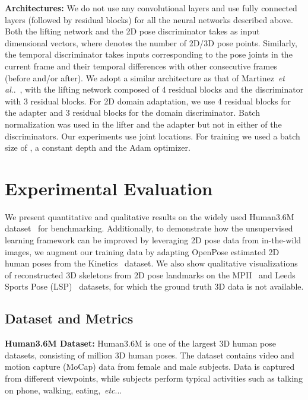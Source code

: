 \documentclass[10pt,twocolumn,letterpaper]{article}
\makeatletter
\DeclareRobustCommand\onedot{\futurelet\@let@token\@onedot}
\def\@onedot{\ifx\@let@token.\else.\null\fi\xspace}
\def\etc{\emph{etc}\onedot} \def\vs{\emph{vs}\onedot}
\def\etal{\emph{et al}\onedot}
\makeatother
\begin{document}
\textbf{Architectures:} We do not use any convolutional layers and use fully connected layers (followed by residual blocks) for all the neural networks described above. Both the lifting network and the 2D pose discriminator takes as input  dimensional vectors, where  denotes the number of 2D/3D pose points. Similarly, the temporal discriminator takes  inputs corresponding to the pose joints in the current frame and their temporal differences with  other consecutive frames (before and/or after). We adopt a similar architecture as that of Martinez~\etal~\cite{MartinezICCV2017}, with the lifting network composed of 4 residual blocks and the discriminator with 3 residual blocks. For 2D domain adaptation, we use 4 residual blocks for the adapter and 3 residual blocks for the domain discriminator. Batch normalization was used in the lifter and the adapter but not in either of the discriminators.
Our experiments use  joint locations. For training we used a batch size of , a constant depth  and the Adam optimizer.  

\section{Experimental Evaluation}
\label{sect:experiments}
We present quantitative and qualitative results on the widely used Human3.6M dataset~\cite{h36m} for benchmarking. Additionally, to demonstrate how the unsupervised learning framework can be improved by leveraging 2D pose data from in-the-wild images, we augment our training data by adapting OpenPose estimated 2D human poses from the Kinetics~\cite{kinetics} dataset. We also show qualitative visualizations of reconstructed 3D skeletons from 2D pose landmarks on the MPII~\cite{andriluka14cvpr} and Leeds Sports Pose (LSP)~\cite{johnson2010clustered} datasets, for which the ground truth 3D data is not available.




\subsection{Dataset and Metrics}
\label{sect:dataset_metrics}



\noindent\textbf{Human3.6M Dataset:} Human3.6M is one of the largest 3D human pose datasets, consisting of  million 3D human poses. The dataset contains video and motion capture (MoCap) data from  female and  male subjects. Data is captured from  different viewpoints, while subjects perform typical activities such as talking on phone, walking, eating,~\etc.
\end{document}
